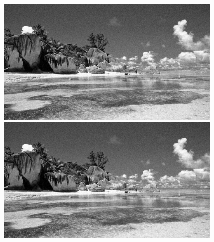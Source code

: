 {    \begin{figure}[H]
        \centering
        \begin{minipage}[b]{0.4\textwidth}
            \includegraphics[width=\textwidth]{Images/Denoised_wiener.jpg}
            \caption{}
        \end{minipage}
        \begin{minipage}[b]{0.4\textwidth}
            \includegraphics[width=\textwidth]{Images/Denoised_filter.jpg}
            \caption{}
        \end{minipage}
    \end{figure}
    
}
